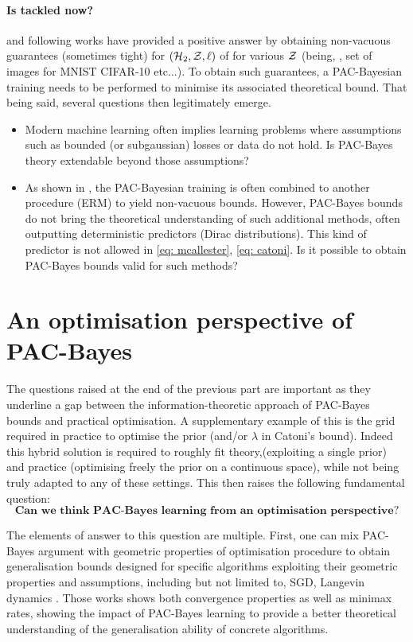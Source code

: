 \paragraph{Is  tackled now?}
\citep{dziugaite2017computing} and following works have provided a positive answer by obtaining non-vacuous guarantees (sometimes tight) for $(\mathcal{H}_2,\mathcal{Z},\ell)$ of  for various $\mathcal{Z}$ (being, \eg, set of images for MNIST CIFAR-10 etc...). To obtain such guarantees, a PAC-Bayesian training needs to be performed to minimise its associated theoretical bound. That being said, several questions then legitimately emerge.

\begin{itemize}
  \item Modern machine learning often implies learning problems where assumptions such as bounded (or subgaussian) losses or \iid data do not hold. Is PAC-Bayes theory extendable beyond those assumptions? 
  \item As shown in \citet{dziugaite2017computing}, the PAC-Bayesian training is often combined to another procedure (\eg ERM) to yield non-vacuous bounds. However, PAC-Bayes bounds do not bring the theoretical understanding of such additional methods, often outputting deterministic predictors (\ie Dirac distributions). This kind of predictor is not allowed in \eqref{eq: mcallester}, \eqref{eq: catoni}. Is it possible to obtain PAC-Bayes bounds valid for such methods? 
\end{itemize}



\section{An optimisation perspective of PAC-Bayes}

The questions raised at the end of the previous part are important as they underline a gap between the information-theoretic approach of PAC-Bayes bounds and practical optimisation. A supplementary example of this is the grid required in practice to optimise the prior (and/or $\lambda$ in Catoni's bound). Indeed this hybrid solution is required to roughly fit theory,(exploiting a single prior) and practice (optimising freely the prior on a continuous space), while not being truly adapted to any of these settings. This then raises the following fundamental question:
\[ \textbf{Can we think PAC-Bayes learning from an optimisation perspective?} \]

The elements of answer to this question are multiple. First, one can mix PAC-Bayes argument with geometric properties of optimisation procedure to obtain generalisation bounds designed for specific algorithms exploiting their geometric properties and assumptions, including but not limited to, SGD, Langevin dynamics  \citep{london2017pac,dziugaite2018entropy,neu2021info,clerico2022generalisation,haghifam2023limit,zhou2023toward}. Those works shows both convergence properties as well as minimax rates, showing the impact of PAC-Bayes learning to provide a better theoretical understanding of the generalisation ability of concrete algorithms. 

